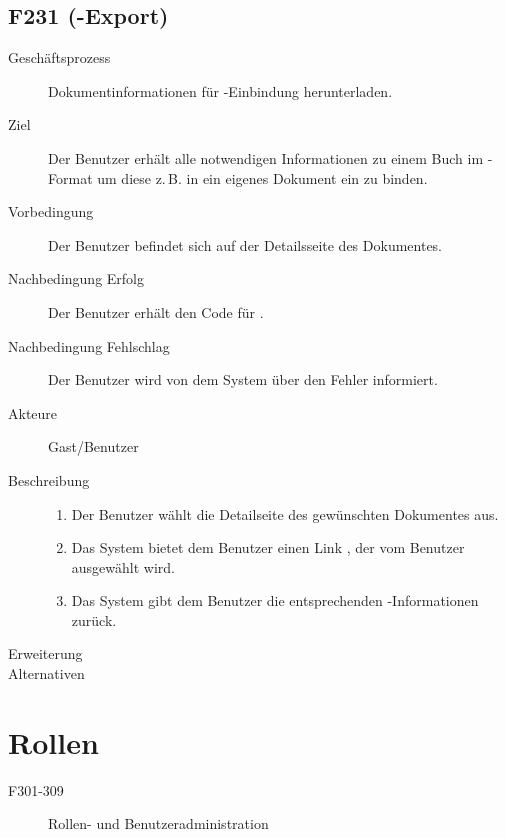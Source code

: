 \subsection{F231 (\BibTeX -Export)}
\begin{description}
  \item[Geschäftsprozess]Dokumentinformationen für \BibTeX-Einbindung herunterladen.
  \item[Ziel]Der Benutzer erhält alle notwendigen Informationen zu einem Buch im \BibTeX-Format um diese z.\,B. in ein eigenes Dokument ein zu binden.
  \item[Vorbedingung]Der Benutzer befindet sich auf der Detailsseite des Dokumentes.
  \item[Nachbedingung Erfolg]Der Benutzer erhält den Code für \BibTeX .
  \item[Nachbedingung Fehlschlag]Der Benutzer wird von dem System über den Fehler informiert.
  \item[Akteure]Gast/Benutzer
  \item[Beschreibung]\hfill
    \begin{enumerate}
      \item Der Benutzer wählt die Detailseite des gewünschten Dokumentes aus.
      \item Das System bietet dem Benutzer einen Link \emph{\BibTeX}, der vom Benutzer ausgewählt wird.
      \item Das System gibt dem Benutzer die entsprechenden \BibTeX -Informationen zurück.
    \end{enumerate}
  \item[Erweiterung]
  \item[Alternativen]
\end{description}


\section{Rollen}
\begin{description}
  \item[F301-309]Rollen- und Benutzeradministration
\end{description}

